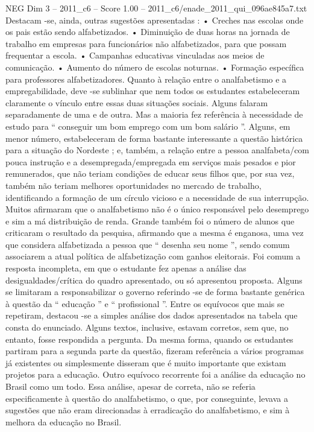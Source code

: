 \begin{textsample}{NEG Dim 3 – 2011\_c6 – Score 1.00 – 2011\_c6/enade\_2011\_qui\_096ae845a7.txt}
Destacam -se, ainda, outras sugestões apresentadas : • Creches nas escolas onde os pais estão sendo alfabetizados. • Diminuição de duas horas na jornada de trabalho em empresas para funcionários não alfabetizados, para que possam frequentar a escola. • Campanhas educativas vinculadas aos meios de comunicação. • Aumento do número de escolas noturnas. • Formação específica para professores alfabetizadores.
Quanto à relação entre o analfabetismo e a empregabilidade, deve -se sublinhar que nem todos os estudantes estabeleceram claramente o vínculo entre essas duas situações sociais.
Alguns falaram separadamente de uma e de outra.
Mas a maioria fez referência à necessidade de estudo para “ conseguir um bom emprego com um bom salário ”.
Alguns, em menor número, estabeleceram de forma bastante interessante a questão histórica para a situação do Nordeste ; e, também, a relação entre a pessoa analfabeta/com pouca instrução e a desempregada/empregada em serviços mais pesados e pior remunerados, que não teriam condições de educar seus filhos que, por sua vez, também não teriam melhores oportunidades no mercado de trabalho, identificando a formação de um círculo vicioso e a necessidade de sua interrupção.
Muitos afirmaram que o analfabetismo não é o único responsável pelo desemprego e sim a má distribuição de renda.
Grande também foi o número de alunos que criticaram o resultado da pesquisa, afirmando que a mesma é enganosa, uma vez que considera alfabetizada a pessoa que “ desenha seu nome ”, sendo comum associarem a atual política de alfabetização com ganhos eleitorais.
Foi comum a resposta incompleta, em que o estudante fez apenas a análise das desigualdades/crítica do quadro apresentado, ou só apresentou proposta.
Alguns se limitaram a responsabilizar o governo referindo -se de forma bastante genérica à questão da “ educação ” e “ profissional ”.
Entre os equívocos que mais se repetiram, destacou -se a simples análise dos dados apresentados na tabela que consta do enunciado.
Alguns textos, inclusive, estavam corretos, sem que, no entanto, fosse respondida a pergunta.
Da mesma forma, quando os estudantes partiram para a segunda parte da questão, fizeram referência a vários programas já existentes ou simplesmente disseram que é muito importante que existam projetos para a educação.
Outro equívoco recorrente foi a análise da educação no Brasil como um todo.
Essa análise, apesar de correta, não se referia especificamente à questão do analfabetismo, o que, por conseguinte, levava a sugestões que não eram direcionadas à erradicação do analfabetismo, e sim à melhora da educação no Brasil.

\end{textsample}
